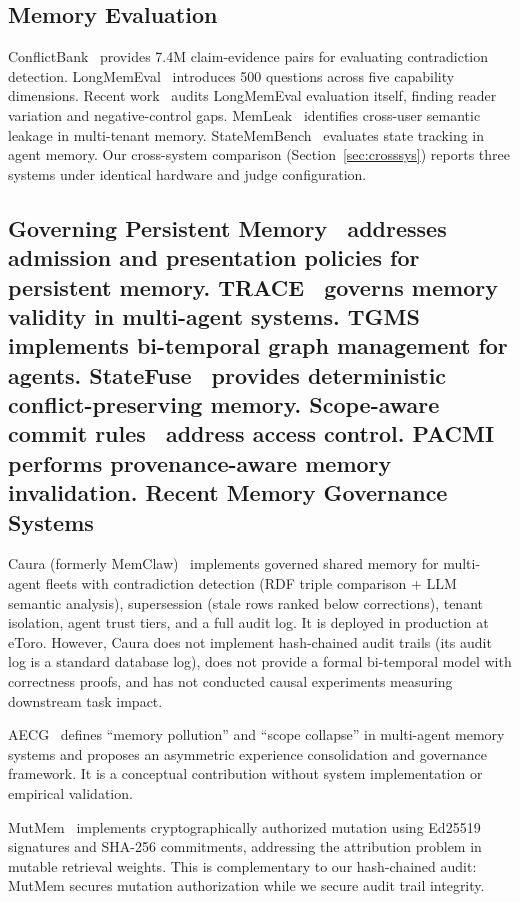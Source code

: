 \documentclass{article}
\begin{document}
\subsection{Memory Evaluation}
ConflictBank~\citep{conflictbank} provides 7.4M claim-evidence pairs for evaluating contradiction detection. LongMemEval~\citep{wu2024longmemeval} introduces 500 questions across five capability dimensions. Recent work~\citep{auditlme} audits LongMemEval evaluation itself, finding reader variation and negative-control gaps. MemLeak~\citep{memleak} identifies cross-user semantic leakage in multi-tenant memory. StateMemBench~\citep{statemem2} evaluates state tracking in agent memory. Our cross-system comparison (Section~\ref{sec:crosssys}) reports three systems under identical hardware and judge configuration.


\subsection{Governing Persistent Memory~\citep{governingmem} addresses admission and presentation policies for persistent memory. TRACE~\citep{trace2026} governs memory validity in multi-agent systems. TGMS~\citep{tgms} implements bi-temporal graph management for agents. StateFuse~\citep{statefuse} provides deterministic conflict-preserving memory. Scope-aware commit rules~\citep{scopeaware} address access control. PACMI~\citep{pacmi} performs provenance-aware memory invalidation. Recent Memory Governance Systems}

Caura (formerly MemClaw)~\cite{caura} implements governed shared memory for multi-agent fleets with contradiction detection (RDF triple comparison + LLM semantic analysis), supersession (stale rows ranked below corrections), tenant isolation, agent trust tiers, and a full audit log. It is deployed in production at eToro. However, Caura does not implement hash-chained audit trails (its audit log is a standard database log), does not provide a formal bi-temporal model with correctness proofs, and has not conducted causal experiments measuring downstream task impact.

AECG~\cite{aecg} defines ``memory pollution'' and ``scope collapse'' in multi-agent memory systems and proposes an asymmetric experience consolidation and governance framework. It is a conceptual contribution without system implementation or empirical validation.

MutMem~\cite{mutmem} implements cryptographically authorized mutation using Ed25519 signatures and SHA-256 commitments, addressing the attribution problem in mutable retrieval weights. This is complementary to our hash-chained audit: MutMem secures mutation authorization while we secure audit trail integrity.
\end{document}
